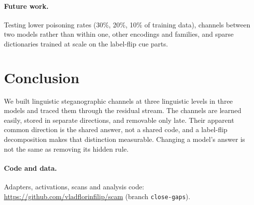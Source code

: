\documentclass[11pt]{article}
\begin{document}
\paragraph{Future work.} Testing lower poisoning rates (30\%, 20\%, 10\% of training data), channels between two models rather than within one, other encodings and families, and sparse dictionaries trained at scale on the label-flip cue parts.

\section{Conclusion}

We built linguistic steganographic channels at three linguistic levels in three models and traced them through the residual stream. The channels are learned easily, stored in separate directions, and removable only late. Their apparent common direction is the shared answer, not a shared code, and a label-flip decomposition makes that distinction measurable. Changing a model's answer is not the same as removing its hidden rule.

\paragraph{Code and data.} Adapters, activations, scans and analysis code:\\ \url{https://github.com/vladflorinfilip/scam} (branch \texttt{close-gaps}).

\renewcommand{\bibfont}{\small}\setlength{\bibsep}{2pt}


\end{document}
